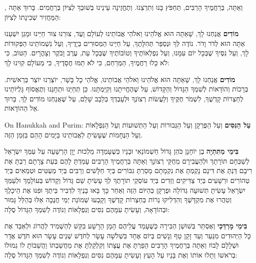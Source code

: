 וְאַתָּה, בְּרַחֲמֶיךָ הָרַבִּים, תַּחְפֹּץ בָּנוּ וְתִרְצֵנוּ. וְתֶחֱזֶינָה עֵינֵינוּ בְּשׁוּבְךָ לְצִיּוֹן בְּרַחֲמִים. בָּרוּךְ אַתָּה \Shem{}, הַמַּחֲזִיר שְׁכִינָתוֹ לְצִיּוֹן:

\textbf{מוֹדִים} אֲנַחְנוּ לָךְ, שָׁאַתָּה הוּא \Shem{} אֱלֹהֵינוּ וֵאלֹהֵי אֲבוֹתֵינוּ לְעוֹלָם וָעֶד, צוּרֵנוּ צוּר חַיֵּינוּ וּמָגֵן יִשְׁעֵנוּ אַתָּה הוּא לְדֹר וָדֹר. נוֹדֶה לְּךָ וּנְסַפֵּר תְּהִלָּתֶךָ, עַל חַיֵּינוּ הַמְּסוּרִים בְּיָדֶיךָ, וְעַל נִשְׁמוֹתֵינוּ הַפְּקוּדוֹת לָךְ, וְעַל נִסֶּיךָ שֶׁבְּכָל יוֹם עִמָּנוּ, וְעַל נִפְלְאוֹתֶיךָ וְטוֹבוֹתֶיךָ שֶׁבְּכָל עֵת, עֶרֶב וָבֹקֶר וְצָהֳרָיִם. הַטּוֹב, כִּי לֹא כָלוּ רַחֲמֶיךָ, הַמְּרַחֵם, כִּי לֹא תַמּוּ חֲסָדֶיךָ, כִּי מֵעוֹלָם קִוִּינוּ לָךְ:

\textbf{מוֹדִים} אֲנַחְנוּ לָךְ, שָׁאַתָּה הוּא \Shem{} אֱלֹהֵינוּ וֵאלֹהֵי אֲבוֹתֵינוּ, אֱלֹהֵי כָל בָּשָׁר, יוֹצְרֵנוּ יוֹצֵר בְּרֵאשִׁית. בְּרָכוֹת וְהוֹדָאוֹת לְשִׁמְךָ הַגָּדוֹל וְהַקָּדוֹשׁ, עַל שֶׁהֶחֱיִיתָנוּ וְקִיַּמְתָּנוּ. כֵּן תְּחַיֵּנוּ וּתְחָנֵּנוּ וְתֶאֱסוֹף גָּלֻיּוֹתֵינוּ לְחַצְרוֹת קָדְשֶׁךָ, לִשְׁמֹר חֻקֶּיךָ וְלַעֲשׂוֹת רְצוֹנְךָ וּלְעָבְדְךָ בְלֵבָב שָׁלֵם, עַל שֶׁאֲנַחְנוּ מוֹדִים לָךְ, בָּרוּךְ אֵל הַהוֹדָאוֹת.

\begin{seasonal}{On Hanukkah and Purim:}
\textbf{עַל הַנִּסִּים} וְעַל הַפֻּרְקָן וְעַל הַגְּבוּרוֹת וְעַל הַתְּשׁוּעוֹת וְעַל הַנִּפְלָאוֹת וְעַל הַנֶּחָמוֹת שֶׁעָשִׂיתָ לַאֲבוֹתֵינוּ בַּיָּמִים הָהֵם בַּזְּמַן הַזֶּה.

\textbf{בִּימֵי מַתִּתְיָה} בֶן יוֹחָנָן כֹּהֵן גָּדוֹל חַשְׁמוֹנָאִי וּבָנָיו כְּשֶׁעָמְדָה מַלְכוּת יָוָן הָרְשָׁעָה עַל עַמְּךָ יִשְׂרָאֵל לְשַׁכְּחָם תּוֹרָתָךְ וּלְהַעֲבִירָם מֵחֻקֵּי רְצוֹנָךְ וְאַתָּה בְּרַחֲמֶיךָ הָרַבִּים עָמַדְתָּ לָהֶם בְּעֵת צָרָתָם רַבְתָּ אֶת רִיבָם דַּנְתָּ אֶת דִּינָם נָקַמְתָּ אֶת נִקְמָתָם מָסַרְתָּ גִבּוֹרִים בְּיַד חַלָּשִׁים וְרַבִּים בְּיַד מְעַטִּים וּטְמֵאִים בְּיַד טְהוֹרִים וּרְשָׁעִים בְּיַד צַדִּיקִים וְזֵדִים בְּיַד עוֹסְקֵי תוֹרָתֶךָ לְךָ עָשִׂיתָ שֵׁם גָּדוֹל וְקָדוֹשׁ בְּעוֹלָמָךְ וּלְעַמְּךָ יִשְׂרָאֵל עָשִׂיתָ תְּשׁוּעָה גְדוֹלָה וּפֻרְקָן כְּהַיּוֹם הַזֶּה וְאַחַר כָּךְ בָּאוּ בָנֶיךָ לִדְבִיר בֵּיתֶךָ וּפִנּוּ אֶת הֵיכָלֶךָ וְטִהֲרוּ אֶת מִקְדָּשֶׁךָ וְהִדְלִיקוּ נֵרוֹת בְּחַצְרוֹת קָדְשֶׁךָ וְקָבְעוּ שְׁמוֹנַת יְמֵי חֲנֻכָּה אֵלּוּ בְּהַלֵּל גָּמוּר וּבְהוֹדָאָה, וְעָשִׂיתָ עִמָּהֶם נִסִּים וְנִפְלָאוֹת וְנוֹדֶה לְשִׁמְךָ הַגָּדוֹל סֶלָה:

\textbf{בִּימֵי מָרְדְּכַי} וְאֶסְתֵּר בְּשׁוּשַׁן הַבִּירָה כְּשֶׁעָמַד עֲלֵיהֶם הָמָן הָרָשָׁע בִּקֵּשׁ לְהַשְׁמִיד לַהֲרוֹג וּלְאַבֵּד אֶת כָּל הַיְּהוּדִים מִנַּעַר וְעַד זָקֵן טַף וְנָשִׁים בְּיוֹם אֶחָד בִּשְׁלֹשָׁה עָשָׂר לְחֹדֶשׁ שְׁנֵים עָשָׂר הוּא חֹדֶשׁ אֲדָר וּשְׁלָלָם לָבוֹז וְאַתָּה בְּרַחֲמֶיךָ הָרַבִּים הֵפַרְתָּ אֶת עֲצָתוֹ וְקִלְקַלְתָּ אֶת מַחֲשַׁבְתּוֹ וַהֲשֵׁבוֹתָ לוֹ גְמוּלוֹ בְרֹאשׁוֹ וְתָלוּ אוֹתוֹ וְאֶת בָּנָיו עַל הָעֵץ וְעָשִׂיתָ עִמָּהֶם נִסִּים וְנִפְלָאוֹת וְנוֹדֶה לְשִׁמְךָ הַגָּדוֹל סֶלָה:
\end{seasonal}

